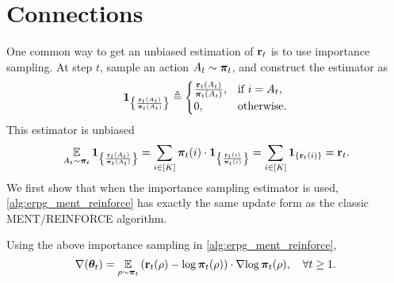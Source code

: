 \section{Connections}

One common way to get an unbiased estimation of ${\mathbf{r}}_t$ is to use importance sampling. At step $t$, sample an action $A_t \sim {\boldsymbol{\pi}}_t$, and construct the estimator as
\begin{equation*}
    {\mathbf{1}}_{ \left\{ \frac{{\mathbf{r}}_t(A_t) }{{\boldsymbol{\pi}}_t(A_t)}  \right\} } \triangleq \begin{cases}
		\frac{{\mathbf{r}}_t(A_t) }{{\boldsymbol{\pi}}_t(A_t)}, & \text{if } i = A_t, \\
		0, & \text{otherwise}.
		\end{cases}
\end{equation*}
This estimator is unbiased
\begin{equation*}
    \operatorname*{{\mathbb{E}}}\limits_{A_t \sim {\boldsymbol{\pi}}_t}{ {\mathbf{1}}_{ \left\{ \frac{{\mathbf{r}}_t(A_t) }{{\boldsymbol{\pi}}_t(A_t)}  \right\} } } = \sum\limits_{ i \in [K] }{ {\boldsymbol{\pi}}_t(i) \cdot {\mathbf{1}}_{ \left\{ \frac{{\mathbf{r}}_t(i) }{{\boldsymbol{\pi}}_t(i)}  \right\} }  } = \sum\limits_{i \in [K] }{ {\mathbf{1}}_{ \left\{ {\mathbf{r}}_t(i)  \right\} } } = {\mathbf{r}}_t.
\end{equation*}
We first show that when the importance sampling estimator is used, \cref{alg:erpg_ment_reinforce} has exactly the same update form as the classic MENT/REINFORCE algorithm.

\begin{lem}
\label{lem:equivalence_ment_reinforce}
Using the above importance sampling in \cref{alg:erpg_ment_reinforce},
\begin{equation*}
    \nabla{({\boldsymbol{\theta}}_t)} = \operatorname*{{\mathbb{E}}}\limits_{\rho \sim {\boldsymbol{\pi}}_t}{ \left( {\mathbf{r}}_t(\rho) - \log{{\boldsymbol{\pi}}_t(\rho)} \right) \cdot \nabla{ \log{{\boldsymbol{\pi}}_t(\rho)} } }, \quad \forall t \ge 1.
\end{equation*}
\end{lem}